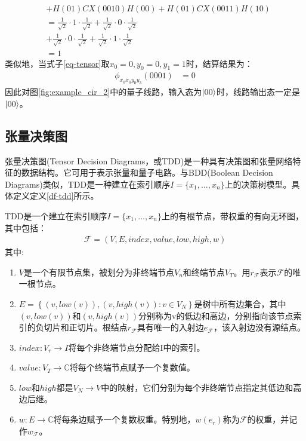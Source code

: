 \begin{example}
\begin{equation}
\begin{aligned}
        &+H\left(01\right)CX\left(0010\right)H\left(00\right)+H\left(01\right)CX\left(0011\right)H\left(10\right)\\
        &=\frac{1}{\sqrt{2}}\cdot 1 \cdot \frac{1}{\sqrt{2}}+\frac{1}{\sqrt{2}}\cdot 0 \cdot\frac{1}{\sqrt{2}}\\
        &+\frac{1}{\sqrt{2}}\cdot 0 \cdot \frac{1}{\sqrt{2}}+\frac{1}{\sqrt{2}}\cdot 1 \cdot\frac{1}{\sqrt{2}}\\
        &= 1
    \end{aligned}
    \label{eq-ex_cal_1}
\end{equation}
类似地，当式子\ref{eq-tensor}取\(x_0 = 0, y_0 = 0, y_1 = 1\)时，结算结果为：
\begin{equation}
    \begin{aligned}
\phi_{x_0x_0y_0y_3}\left(0001\right)&=0
    \end{aligned}
\end{equation}
因此对图\ref{fig:example_cir_2}中的量子线路，输入态为\(\ket{00}\)时，线路输出态一定是\(\ket{00}\)。
\end{example}
\subsection{张量决策图}
张量决策图(Tensor Decision Diagrams，或TDD)是一种具有决策图和张量网络特征的数据结构\citep{Hong_2022}。它可用于表示张量和量子电路。与BDD(Boolean Decision Diagrams)类似，TDD是一种建立在索引顺序$I=\{x_1,\ldots,x_n\}$上的决策树模型。具体定义定义\ref{df-tdd}所示。
\begin{definition}
    \label{df-tdd}
    TDD是一个建立在索引顺序$I=\{x_1,\ldots,x_n\}$上的有根节点，带权重的有向无环图，其中包括：
    \begin{align}
        \mathcal{F}=\left(V,E,index,value,low,high,w\right)
    \end{align}
    其中:
    \begin{enumerate}
        \item $V$是一个有限节点集，被划分为非终端节点$V_n$和终端节点$V_T$。用$r_{\mathcal{F}}$表示$\mathcal{F}$的唯一根节点。
        \item $E=\left\{\left(v,low\left(v\right)\right),\left(v,high\left(v\right)\right):v\in V_N\right\}$是树中所有边集合，其中$\left(v,low\left(v\right)\right)$和$\left(v,high\left(v\right)\right)$分别称为v的低边和高边，分别指向该节点索引的负切片和正切片。根结点$r_{\mathcal{F}}$具有唯一的入射边$e_{\mathcal{F}}$，该入射边没有源结点。
        \item $index:V_r\rightarrow I$将每个非终端节点分配给I中的索引。
        \item $value:V_T\rightarrow\mathbb{C}$将每个终端节点赋予一个复数值。
        \item $low$和$high$都是$V_N\rightarrow V$中的映射，它们分别为每个非终端节点指定其低边和高边后继。
        \item $w:E\rightarrow\mathbb{C}$将每条边赋予一个复数权重。特别地，$w\left(e_r\right)$称为$\mathcal{F}$的权重，并记作$w_{\mathcal{F}}$。
    \end{enumerate} 
\end{definition}


